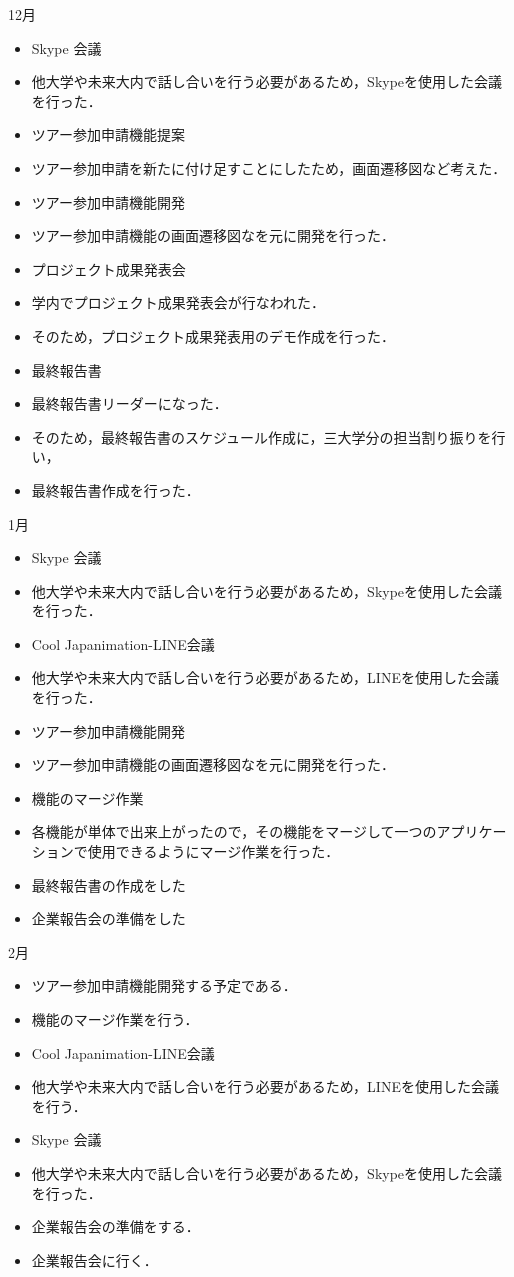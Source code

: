 12月
\begin{itemize}
\item Skype 会議
\item   他大学や未来大内で話し合いを行う必要があるため，Skypeを使用した会議を行った．
\item ツアー参加申請機能提案
\item    ツアー参加申請を新たに付け足すことにしたため，画面遷移図など考えた．　
\item ツアー参加申請機能開発
\item    ツアー参加申請機能の画面遷移図なを元に開発を行った．
\item プロジェクト成果発表会
\item    学内でプロジェクト成果発表会が行なわれた．
\item    そのため，プロジェクト成果発表用のデモ作成を行った．
\item 最終報告書
\item   最終報告書リーダーになった．
\item   そのため，最終報告書のスケジュール作成に，三大学分の担当割り振りを行い，
\item   最終報告書作成を行った．
\end{itemize}

1月
\begin{itemize}
\item Skype 会議
\item   他大学や未来大内で話し合いを行う必要があるため，Skypeを使用した会議を行った．
\item Cool Japanimation-LINE会議
\item   他大学や未来大内で話し合いを行う必要があるため，LINEを使用した会議を行った．
\item ツアー参加申請機能開発
\item   ツアー参加申請機能の画面遷移図なを元に開発を行った．	
\item 機能のマージ作業
\item   各機能が単体で出来上がったので，その機能をマージして一つのアプリケーションで使用できるようにマージ作業を行った．
\item 最終報告書の作成をした
\item 企業報告会の準備をした
\end{itemize}

2月
\begin{itemize}
\item ツアー参加申請機能開発する予定である．
\item 機能のマージ作業を行う．
\item Cool Japanimation-LINE会議
\item   他大学や未来大内で話し合いを行う必要があるため，LINEを使用した会議を行う．
\item Skype 会議
\item   他大学や未来大内で話し合いを行う必要があるため，Skypeを使用した会議を行った．
\item 企業報告会の準備をする．
\item 企業報告会に行く．
\end{itemize}

